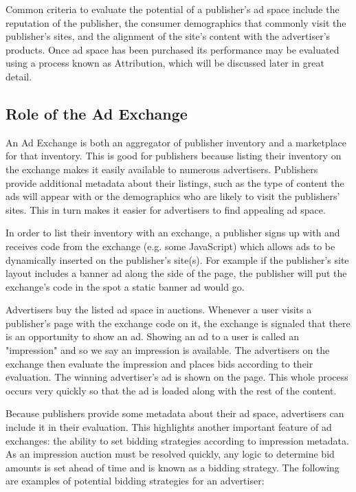 \documentclass{article}
\begin{document}
Common criteria to evaluate the potential of a publisher's ad space include the reputation of the publisher, the consumer demographics that commonly visit the publisher's sites, and the alignment of the site's content with the advertiser's products. Once ad space has been purchased its performance may be evaluated using a process known as Attribution, which will be discussed later in great detail.



\subsection{Role of the Ad Exchange}

An Ad Exchange is both an aggregator of publisher inventory and a marketplace for that inventory. This is good for publishers because listing their inventory on the exchange makes it easily available to numerous advertisers. Publishers provide additional metadata about their listings, such as the type of content the ads will appear with or the demographics who are likely to visit the publishers' sites. This in turn makes it easier for advertisers to find appealing ad space.

In order to list their inventory with an exchange, a publisher signs up with and receives code from the exchange (e.g. some JavaScript) which allows ads to be dynamically inserted on the publisher's site(s). For example if the publisher's site layout includes a banner ad along the side of the page, the publisher will put the exchange's code in the spot a static banner ad would go.

Advertisers buy the listed ad space in auctions. Whenever a user visits a publisher's page with the exchange code on it, the exchange is signaled that there is an opportunity to show an ad. Showing an ad to a user is called an "impression" and so we say an impression is available. The advertisers on the exchange then evaluate the impression and places bids according to their evaluation. The winning advertiser's ad is shown on the page. This whole process occurs very quickly so that the ad is loaded along with the rest of the content.

Because publishers provide some metadata about their ad space, advertisers can include it in their evaluation. This highlights another important feature of ad exchanges: the ability to set bidding strategies according to impression metadata. As an impression auction must be resolved quickly, any logic to determine bid amounts is set ahead of time and is known as a bidding strategy. The following are examples of potential bidding strategies for an advertiser:
\end{document}
